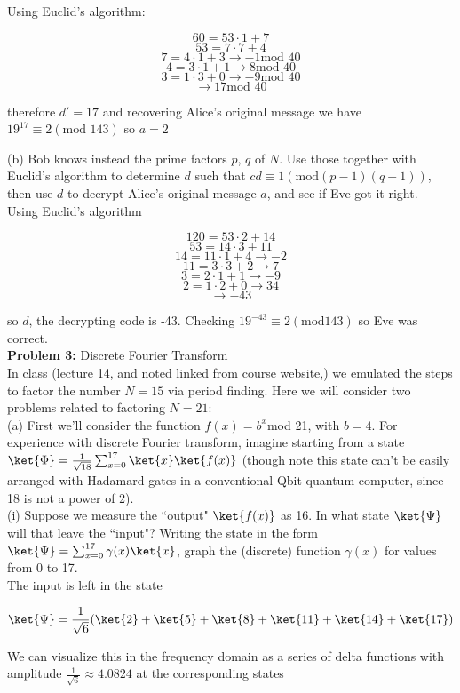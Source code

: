 Using Euclid's algorithm:

$$60=53\cdot1+7$$
$$53=7\cdot7+4$$
$$7=4\cdot1+3\rightarrow-1\text{mod }40$$
$$4=3\cdot1+1\rightarrow8\text{mod }40$$
$$3=1\cdot3+0\rightarrow-9\text{mod }40$$
$$\rightarrow17\text{mod }40$$

therefore $d'=17$ and recovering Alice's original message we have
$19^{17}\equiv2(\text{mod }143)$ so $a=2$

(b) Bob knows instead the prime factors $p$, $q$ of $N$. Use those together
with Euclid's algorithm to determine $d$ such that $cd\equiv1(\text{mod
}(p-1)(q-1))$, then use $d$ to decrypt Alice's original message $a$, and see if
Eve got it right.\\

Using Euclid's algorithm

$$120=53\cdot2+14$$
$$53=14\cdot3+11$$
$$14=11\cdot1+4\rightarrow-2$$
$$11=3\cdot3+2\rightarrow7$$
$$3=2\cdot1+1\rightarrow-9$$
$$2=1\cdot2+0\rightarrow34$$
$$\rightarrow-43$$

so $d$, the decrypting code is -43. Checking $19^{-43}\equiv2(\text{mod
}143)$ so Eve was correct.\\

\textbf{Problem 3:} Discrete Fourier Transform\\
In class (lecture 14, and noted linked from course website,) we emulated the
steps to factor the number $N=15$ via period finding. Here we will consider two
problems related to factoring $N=21$:\\

(a) First we'll consider the function $f(x)=b^x$mod 21, with $b=4$. For
experience with discrete Fourier transform, imagine starting from a state
$\ket{\Phi}=\frac{1}{\sqrt{18}}\sum^{17}_{x=0}\ket{x}\ket{f(x)}$ (though
note this state can't be easily arranged with Hadamard gates in a
conventional Qbit quantum computer, since 18 is not a power of 2).\\

(i) Suppose we measure the ``output" $\ket{f(x)}$ as 16. In what state
$\ket{\Psi}$ will that leave the ``input"? Writing the state in the form
$\ket{\Psi}=\sum^{17}_{x=0}\gamma(x)\ket{x}$, graph the (discrete) function
$\gamma(x)$ for values from 0 to 17.\\

The input is left in the state

$$\ket{\Psi}=\frac{1}{\sqrt{6}}(\ket{2}+\ket{5}+\ket{8}+\ket{11}+\ket{14}+\ket{17})$$

We can visualize this in the frequency domain as a series of delta functions
with amplitude $\frac{1}{\sqrt{6}}\approx4.0824$ at the corresponding states

